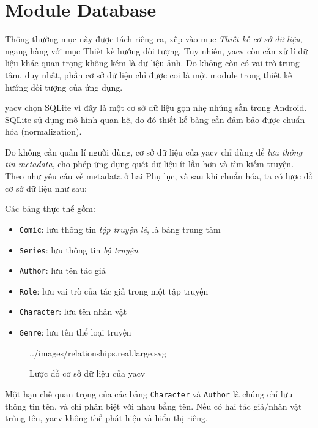 \documentclass[../../../../thesis]{subfiles}
\begin{document}
\section{Module Database}\label{sec:module-database}

Thông thường mục này được tách riêng ra, xếp vào mục \emph{Thiết kế cơ sở dữ
liệu}, ngang hàng với mục Thiết kế hướng đối tượng. Tuy nhiên, yacv còn cần xử
lí dữ liệu khác quan trọng không kém là dữ liệu ảnh. Do không còn có vai trò
trung tâm, duy nhất, phần cơ sở dữ liệu chỉ được coi là một module trong thiết
kế hướng đối tượng của ứng dụng.

yacv chọn SQLite vì đây là một cơ sở dữ liệu gọn nhẹ nhúng sẵn trong Android.
SQLite sử dụng mô hình quan hệ, do đó thiết kế bảng cần đảm bảo được chuẩn hóa
(normalization).

Do không cần quản lí người dùng, cơ sở dữ liệu của yacv chỉ dùng để \emph{lưu
thông tin metadata}, cho phép ứng dụng quét dữ liệu ít lần hơn và tìm kiếm
truyện. Theo như yêu cầu về metadata ở hai Phụ lục, và sau khi chuẩn hóa, ta có
lược đồ cơ sở dữ liệu như sau:

Các bảng thực thể gồm:

\begin{itemize}
    \item
        \texttt{Comic}: lưu thông tin \emph{tập truyện lẻ}, là bảng trung tâm
    \item
        \texttt{Series}: lưu thông tin \emph{bộ truyện}
    \item
        \texttt{Author}: lưu tên tác giả
    \item
        \texttt{Role}: lưu vai trò của tác giả trong một tập truyện
    \item
        \texttt{Character}: lưu tên nhân vật
    \item
        \texttt{Genre}: lưu tên thể loại truyện
\end{itemize}

\begin{wrapfigure}[26]{r}{10cm}
    \vspace*{-10mm}
    
        {../images/relationships.real.large.svg}
    \vspace*{-10mm}
    \caption{Lược đồ cơ sở dữ liệu của yacv}
    \label{fig:db-schema}
\end{wrapfigure}

Một hạn chế quan trọng của các bảng \texttt{Character} và \texttt{Author} là
chúng chỉ lưu thông tin tên, và chỉ phân biệt với nhau bằng tên. Nếu có hai tác
giả/nhân vật trùng tên, yacv không thể phát hiện và hiển thị riêng.
\end{document}
